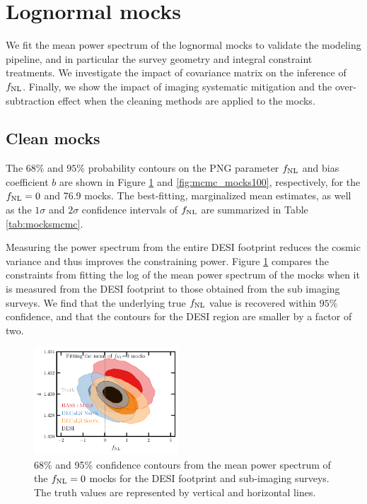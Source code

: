 \section{Lognormal mocks}

We fit the mean power spectrum of the lognormal mocks to validate the modeling pipeline, and in particular the survey geometry and integral constraint treatments. We investigate the impact of covariance matrix on the inference of $f_{\rm NL}$. Finally, we show the impact of imaging systematic mitigation and the over-subtraction effect when the cleaning methods are applied to the mocks. 

\subsection{Clean mocks}
The $68\%$ and $95\%$ probability contours on the PNG parameter $f_{\rm NL}$ and bias coefficient $b$ are shown in Figure \ref{fig:mcmc_mocks0} and \ref{fig:mcmc_mocks100}, respectively, for the $f_{\rm NL}=0$ and 76.9 mocks. The best-fitting, marginalized mean estimates, as well as the $1\sigma$ and $2\sigma$ confidence intervals of $f_{\rm NL}$ are summarized in Table \ref{tab:mocksmcmc}. 

Measuring the power spectrum from the entire DESI footprint reduces the cosmic variance and thus improves the constraining power. Figure \ref{fig:mcmc_mocks0} compares the constraints from fitting the log of the mean power spectrum of the mocks when it is measured from the DESI footprint to those obtained from the sub imaging surveys. We find that the underlying true $f_{\rm NL}$ value is recovered within $95\%$ confidence, and that the contours for the DESI region are smaller by a factor of two. 

\begin{figure}
    \centering
    \includegraphics[width=0.48\textwidth]{figures/mcmc_zero.pdf} 
    \caption{68\% and 95\% confidence contours from the mean power spectrum of the $f_{\rm NL}=0$ mocks for the DESI footprint and sub-imaging surveys. The truth values are represented by vertical and horizontal lines.}\label{fig:mcmc_mocks0}
\end{figure}

